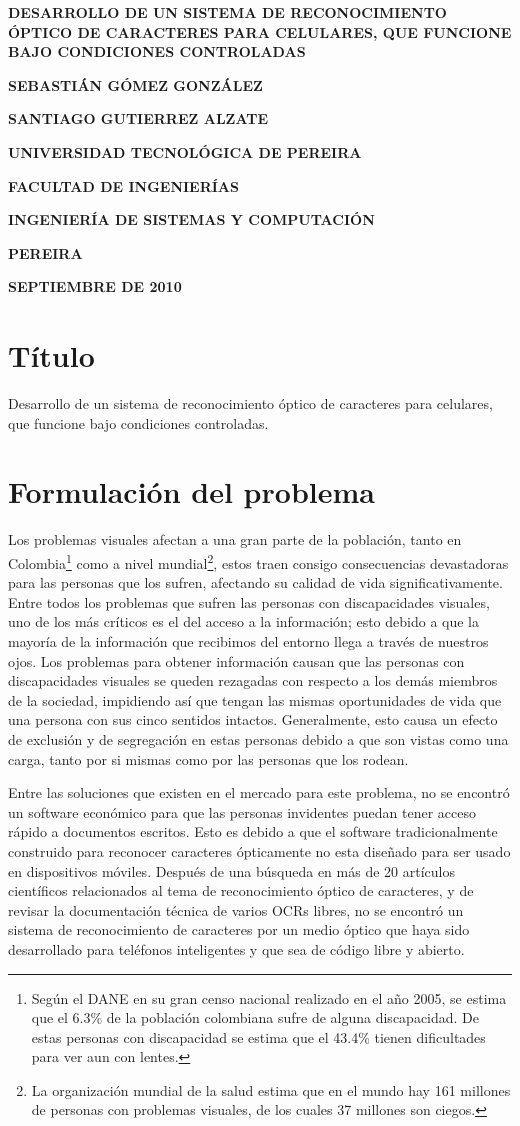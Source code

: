 \documentclass[a4paper, 11pt, oneside]{article}
\newcommand\portada{
	\begin{titlepage}
		\begin{center}
			{\large \bf DESARROLLO DE UN SISTEMA DE RECONOCIMIENTO ÓPTICO DE CARACTERES PARA CELULARES, QUE FUNCIONE BAJO CONDICIONES CONTROLADAS }
			\vfill
			{\large\bf SEBASTIÁN GÓMEZ GONZÁLEZ \par}
			{\large\bf SANTIAGO GUTIERREZ ALZATE \par}
			\vfill
			{\large\bf UNIVERSIDAD TECNOLÓGICA DE PEREIRA  \par}
			{\large\bf FACULTAD DE INGENIERÍAS \par}
			{\large\bf INGENIERÍA DE SISTEMAS Y COMPUTACIÓN \par}
			{\large\bf PEREIRA\par}
			{\large\bf SEPTIEMBRE DE 2010 \par}
		\end{center}
	\end{titlepage}
}
\begin{document}
\portada

	\clearpage
	\section{Título}
	Desarrollo de un sistema de reconocimiento óptico de caracteres para celulares, que funcione bajo condiciones controladas.
	
	\section{Formulación del problema}
	Los problemas visuales afectan a una gran parte de la población, tanto en Colombia\footnote{Según el DANE en su gran censo nacional realizado en el año 2005, se estima que el 6.3\% de la población colombiana sufre de alguna discapacidad. De estas personas con discapacidad se estima que el 43.4\% tienen dificultades para ver aun con lentes.} como a nivel mundial\footnote{La organización mundial de la salud estima que en el mundo hay 161 millones de personas con problemas visuales, de los cuales 37 millones son ciegos.}, estos traen consigo consecuencias devastadoras para las personas que los sufren, afectando su calidad de vida significativamente. Entre todos los problemas que sufren las personas con discapacidades visuales, uno de los más críticos es el del acceso a la información; esto debido a que la mayoría de la información que recibimos del entorno llega a través de nuestros ojos. Los problemas para obtener información causan que las personas con discapacidades visuales se queden rezagadas con respecto a los demás miembros de la sociedad, impidiendo así que tengan las mismas oportunidades de vida que una persona con sus cinco sentidos intactos. Generalmente, esto causa un efecto de exclusión y de segregación en estas personas debido a que son vistas como una carga, tanto por si mismas como por las personas que los rodean. 
	
	Entre las soluciones que existen en el mercado para este problema, no se encontró un software económico para que las personas invidentes puedan tener acceso rápido a documentos escritos. Esto es debido a que el software tradicionalmente construido para reconocer caracteres ópticamente no esta diseñado para ser usado en dispositivos móviles. Después de una búsqueda en más de 20 artículos científicos relacionados al tema de reconocimiento óptico de caracteres, y de revisar la documentación técnica de varios OCRs libres, no se encontró un sistema de reconocimiento de caracteres por un medio óptico que haya sido desarrollado para teléfonos inteligentes y que sea de código libre y abierto.
\end{document}
